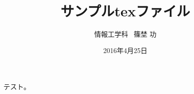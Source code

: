 \documentclass[a4j,12pt]{jarticle}
\title{サンプルtexファイル}
\date{2016年4月25日}
\author{情報工学科 \ 篠埜 功}
\begin{document}
\maketitle

テスト。
\end{document}
